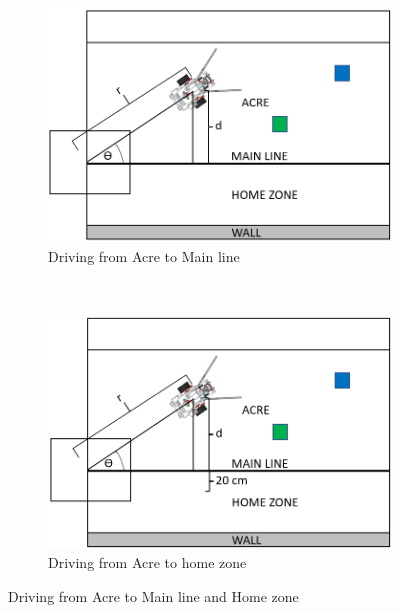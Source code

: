 \begin{figure}[!ht]
	\centering
	\begin{subfigure}[b]{0.45\textwidth}
		\centering
		\includegraphics[width=\textwidth]{Graphics/acreToML}
		\caption{Driving from Acre to Main line}
		\label{fig:drivingtoML}
	\end{subfigure}
	~
	\begin{subfigure}[b]{0.45\textwidth}
		\centering
		\includegraphics[width=\textwidth]{Graphics/acreToHZ}
		\caption{Driving from Acre to home zone}
		\label{fig:drivingtoHZ}
	\end{subfigure}
	\caption{Driving from Acre to Main line and Home zone}
	\label{fig:drivingtoMLHZ}
	\vspace{-4mm}
\end{figure}

